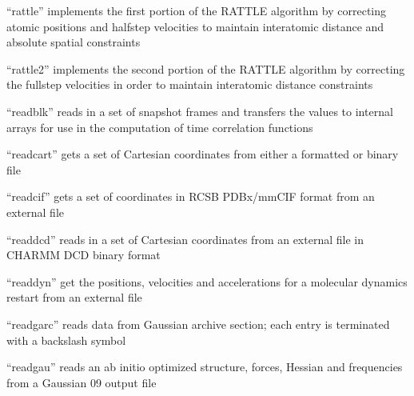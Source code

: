 \documentclass[letterpaper,11pt,english]{sphinxmanual}
\begin{document}
\sphinxAtStartPar
{}

\sphinxAtStartPar
“rattle” implements the first portion of the RATTLE algorithm by correcting atomic positions and half\sphinxhyphen{}step velocities to maintain interatomic distance and absolute spatial constraints

\sphinxAtStartPar
{}

\sphinxAtStartPar
“rattle2” implements the second portion of the RATTLE algorithm by correcting the full\sphinxhyphen{}step velocities in order to maintain interatomic distance constraints

\sphinxAtStartPar
{}

\sphinxAtStartPar
“readblk” reads in a set of snapshot frames and transfers the values to internal arrays for use in the computation of time correlation functions

\sphinxAtStartPar
{}

\sphinxAtStartPar
“readcart” gets a set of Cartesian coordinates from either a formatted or binary file

\sphinxAtStartPar
{}

\sphinxAtStartPar
“readcif” gets a set of coordinates in RCSB PDBx/mmCIF format from an external file

\sphinxAtStartPar
{}

\sphinxAtStartPar
“readdcd” reads in a set of Cartesian coordinates from an external file in CHARMM DCD binary format

\sphinxAtStartPar
{}

\sphinxAtStartPar
“readdyn” get the positions, velocities and accelerations for a molecular dynamics restart from an external file

\sphinxAtStartPar
{}

\sphinxAtStartPar
“readgarc” reads data from Gaussian archive section; each entry is terminated with a backslash symbol

\sphinxAtStartPar
{}

\sphinxAtStartPar
“readgau” reads an ab initio optimized structure, forces, Hessian and frequencies from a Gaussian 09 output file

\sphinxAtStartPar
{}
\end{document}
